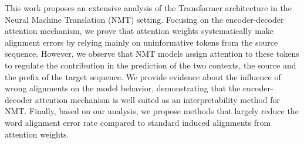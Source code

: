 This work proposes an extensive analysis of the Transformer architecture in the Neural Machine Translation (NMT) setting. Focusing on the encoder-decoder attention mechanism, we prove that attention weights systematically make alignment errors by relying mainly on uninformative tokens from the source sequence. However, we observe that NMT models assign attention to these tokens to regulate the contribution in the prediction of the two contexts, the source and the prefix of the target sequence. We provide evidence about the influence of wrong alignments on the model behavior, demonstrating that the encoder-decoder attention mechanism is well suited as an interpretability method for NMT. Finally, based on our analysis, we propose methods that largely reduce the word alignment error rate compared to standard induced alignments from attention weights.
